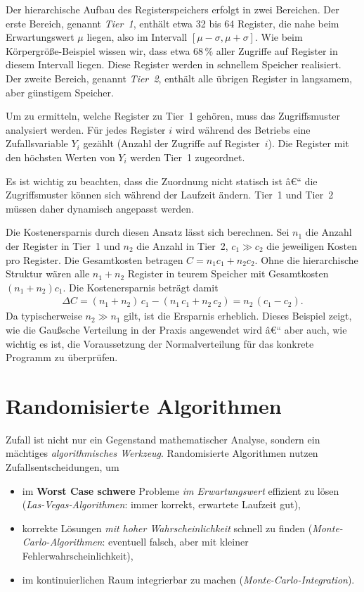 ﻿\documentclass[12pt,a4paper]{article}
\theoremstyle{definition}
\theoremstyle{plain}
\theoremstyle{remark}
\begin{document}
Der hierarchische Aufbau des Registerspeichers erfolgt in zwei Bereichen. Der
erste Bereich, genannt \emph{Tier~1}, enthält etwa 32 bis 64 Register, die
nahe beim Erwartungswert $\mu$ liegen, also im Intervall
$[\mu - \sigma, \mu + \sigma]$. Wie beim Körpergröße-Beispiel wissen wir,
dass etwa $68\,\%$ aller Zugriffe auf Register in diesem Intervall liegen.
Diese Register werden in schnellem Speicher realisiert. Der zweite Bereich,
genannt \emph{Tier~2}, enthält alle übrigen Register in langsamem, aber
günstigem Speicher.

Um zu ermitteln, welche Register zu Tier~1 gehören, muss das Zugriffsmuster
analysiert werden. Für jedes Register $i$ wird während des Betriebs eine
Zufallsvariable $Y_i$ gezählt (Anzahl der Zugriffe auf Register~$i$). Die
Register mit den höchsten Werten von $Y_i$ werden Tier~1 zugeordnet.

Es ist wichtig zu beachten, dass die Zuordnung nicht statisch ist â€“ die
Zugriffsmuster können sich während der Laufzeit ändern. Tier~1 und Tier~2
müssen daher dynamisch angepasst werden.

Die Kostenersparnis durch diesen Ansatz lässt sich berechnen. Sei $n_1$ die
Anzahl der Register in Tier~1 und $n_2$ die Anzahl in Tier~2, $c_1 \gg c_2$
die jeweiligen Kosten pro Register. Die Gesamtkosten betragen
$C = n_1 c_1 + n_2 c_2$. Ohne die hierarchische Struktur wären alle
$n_1 + n_2$ Register in teurem Speicher mit Gesamtkosten
$(n_1 + n_2) c_1$. Die Kostenersparnis beträgt damit
\begin{align}
  \Delta C = (n_1 + n_2)\,c_1 - (n_1\,c_1 + n_2\,c_2) = n_2\,(c_1 - c_2).
\end{align}
Da typischerweise $n_2 \gg n_1$ gilt, ist die Ersparnis erheblich. Dieses
Beispiel zeigt, wie die Gaußsche Verteilung in der Praxis angewendet wird â€“
aber auch, wie wichtig es ist, die Voraussetzung der Normalverteilung für
das konkrete Programm zu überprüfen.

\section{Randomisierte Algorithmen}
\label{sec:algorithmen}

Zufall ist nicht nur ein Gegenstand mathematischer Analyse, sondern ein
mächtiges \emph{algorithmisches Werkzeug}. Randomisierte Algorithmen nutzen
Zufallsentscheidungen, um
\begin{itemize}
  \item im \textbf{Worst Case schwere} Probleme \emph{im Erwartungswert}
    effizient zu lösen (\emph{Las-Vegas-Algorithmen}: immer korrekt,
    erwartete Laufzeit gut),
  \item korrekte Lösungen \emph{mit hoher Wahrscheinlichkeit} schnell zu
    finden (\emph{Monte-Carlo-Algorithmen}: eventuell falsch, aber mit
    kleiner Fehlerwahrscheinlichkeit),
  \item im kontinuierlichen Raum integrierbar zu machen
    (\emph{Monte-Carlo-Integration}).
\end{itemize}
\end{document}
